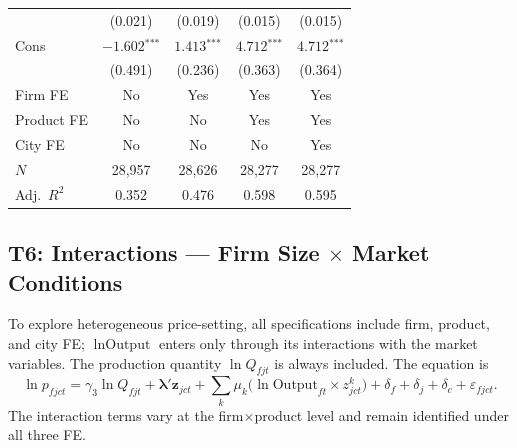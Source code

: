\documentclass[12pt]{article}
\newcommand{\sym}[1]{\ensuremath{^{\text{#1}}}}
\newcommand{\se}[1]{{\small(#1)}}
\begin{document}
\begin{table}[H]
\begin{threeparttable}
\begin{tabular}{lcccc}
                          & \se{0.021} & \se{0.019} & \se{0.015} & \se{0.015} \\[4pt]
      Cons & \(-1.602\sym{***}\) & \(1.413\sym{***}\) & \(4.712\sym{***}\) & \(4.712\sym{***}\) \\
               & \se{0.491} & \se{0.236} & \se{0.363} & \se{0.364} \\
      \midrule
      Firm FE    & No  & Yes & Yes & Yes \\
      Product FE & No  & No  & Yes & Yes \\
      City FE    & No  & No  & No  & Yes \\
      \(N\)      & 28,957 & 28,626 & 28,277 & 28,277 \\
      Adj.\ \(R^2\) & 0.352 & 0.476 & 0.598 & 0.595 \\
      \bottomrule
    \end{tabular}
  \end{threeparttable}
\end{table}

\subsection{T6: Interactions --- Firm Size \texorpdfstring{$\times$}{x} Market Conditions}
\label{sec:t6}

To explore heterogeneous price-setting, all specifications include firm, product,
and city FE; \(\ln\text{Output}\) enters only through its interactions with the
market variables. The production quantity \(\ln Q_{fjt}\) is always included.
The equation is
\begin{equation}
  \ln p_{fjct}
  = \gamma_3 \ln Q_{fjt}
  + \boldsymbol{\lambda}' \mathbf{z}_{jct}
  + \sum_{k} \mu_k \bigl(\ln \text{Output}_{ft} \times z^{k}_{jct}\bigr)
  + \delta_f + \delta_j + \delta_c
  + \varepsilon_{fjct}.
  \label{eq:t6}
\end{equation}
The interaction terms vary at the firm\(\times\)product level and remain
identified under all three FE.
\end{document}
